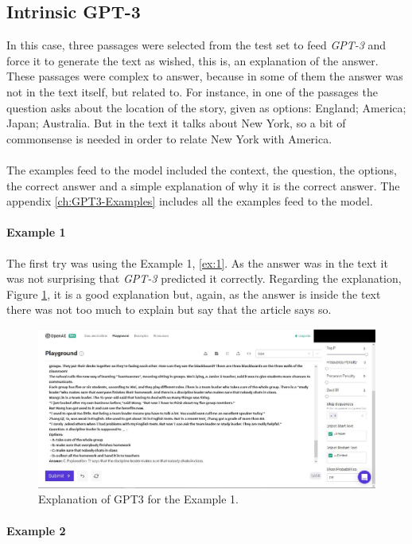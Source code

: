 \cleardoublepage
\subsection{Intrinsic GPT-3}
\label{sec:GPT3Results}
\noindent In this case, three passages were selected from the test set to feed \emph{GPT-3} and force it to generate the text as wished, this is, an explanation of the answer. These passages were complex to answer, because in some of them the answer was not in the text itself, but related to. For instance, in one of the passages the question asks about the location of the story, given as options: England; America; Japan; Australia. But in the text it talks about New York, so a bit of commonsense is needed in order to relate New York with America.
\paragraph{}
The examples feed to the model included the context, the question, the options, the correct answer and a simple explanation of why it is the correct answer. The appendix \ref{ch:GPT3-Examples} includes all the examples feed to the model. 
\paragraph{Example 1}
The first try was using the Example 1, \ref{ex:1}. As the answer was in the text it was not surprising that \emph{GPT-3} predicted it correctly. Regarding the explanation, Figure \ref{fig:gpt3-ex1}, it is a good explanation but, again, as the answer is inside the text there was not too much to explain but say that the article says so.
\begin{figure}[h]
	\centering
	\includegraphics[scale=0.25]{images/gpt3-ex1}
	\caption{Explanation of GPT3 for the Example 1.}
	\label{fig:gpt3-ex1}
\end{figure}
\paragraph{Example 2}

